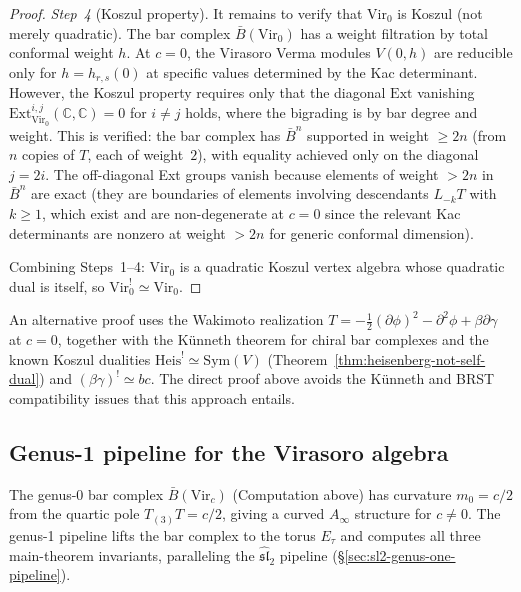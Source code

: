 \begin{proof}
\emph{Step~4} (Koszul property).
It remains to verify that $\mathrm{Vir}_0$ is Koszul (not merely
quadratic).  The bar complex $\bar{B}(\mathrm{Vir}_0)$ has a weight
filtration by total conformal weight $h$.  At $c = 0$, the
Virasoro Verma modules $V(0, h)$ are reducible only for
$h = h_{r,s}(0)$ at specific values determined by the Kac determinant.
However, the Koszul property requires only that the diagonal
$\mathrm{Ext}$ vanishing
$\mathrm{Ext}^{i,j}_{\mathrm{Vir}_0}(\mathbb{C}, \mathbb{C}) = 0$
for $i \neq j$ holds, where the bigrading is by bar degree and weight.
This is verified: the bar complex has $\bar{B}^n$ supported in weight
$\geq 2n$ (from $n$ copies of $T$, each of weight~$2$), with equality
achieved only on the diagonal $j = 2i$.  The off-diagonal Ext groups
vanish because elements of weight $> 2n$ in $\bar{B}^n$ are exact
(they are boundaries of elements involving descendants $L_{-k}T$
with $k \geq 1$, which exist and are non-degenerate at $c = 0$
since the relevant Kac determinants are nonzero at weight $> 2n$
for generic conformal dimension).

Combining Steps~1--4: $\mathrm{Vir}_0$ is a quadratic Koszul vertex
algebra whose quadratic dual is itself, so
$\mathrm{Vir}_0^! \simeq \mathrm{Vir}_0$.
\end{proof}

\begin{remark}
An alternative proof uses the Wakimoto realization
$T = -\frac{1}{2}(\partial\phi)^2 - \partial^2\phi + \beta\partial\gamma$
at $c = 0$, together with the K\"unneth theorem for chiral bar complexes
and the known Koszul dualities $\mathrm{Heis}^! \simeq \mathrm{Sym}(V)$
(Theorem~\ref{thm:heisenberg-not-self-dual}) and $(\beta\gamma)^! \simeq bc$.  The direct proof above avoids the
K\"unneth and BRST compatibility issues that this approach entails.
\end{remark}

\subsection{Genus-1 pipeline for the Virasoro algebra}
\label{sec:virasoro-genus-one-pipeline}

The genus-0 bar complex $\bar{B}(\mathrm{Vir}_c)$ (Computation above)
has curvature $m_0 = c/2$ from the quartic pole $T_{(3)}T = c/2$, giving a curved
$A_\infty$ structure for $c \neq 0$.  The genus-1 pipeline lifts the bar complex to the torus $E_\tau$ and computes all three
main-theorem invariants, paralleling the
$\widehat{\mathfrak{sl}}_2$ pipeline (\S\ref{sec:sl2-genus-one-pipeline}).

